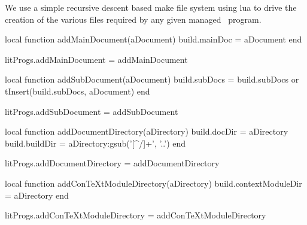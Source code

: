 
\startchapter[title=Lua Make System Files]

We use a simple recursive descent based make file system using lua to 
drive the creation of the various files required by any given 
 managed \ConTeXt\ program. 

\startMkIVCode
\def\addMainDocument#1{
  \directlua{
    thirddata.literateProgs.addMainDocument('#1')
  }
}

\def\addSubDocument#1{
  \directlua{
    thirddata.literateProgs.addSubDocument('#1')
  }
}

\def\addDocumentDirectory#1{
  \directlua{
    thirddata.literateProgs.addDocumentDirectory('#1')
  }
}

\def\addConTeXtModuleDirectory#1{
  \directlua{
    thirddata.literateProgs.addConTeXtModuleDirectory('#1')
  }
}
\stopMkIVCode

\startLuaCode
local function addMainDocument(aDocument)
  build.mainDoc = aDocument
end

litProgs.addMainDocument = addMainDocument

local function addSubDocument(aDocument)
  build.subDocs = build.subDocs or { }
  tInsert(build.subDocs, aDocument)
end

litProgs.addSubDocument = addSubDocument

local function addDocumentDirectory(aDirectory)
  build.docDir   = aDirectory
  build.buildDir = aDirectory:gsub('[^/]+', '..')
end

litProgs.addDocumentDirectory = addDocumentDirectory

local function addConTeXtModuleDirectory(aDirectory)
  build.contextModuleDir = aDirectory
end

litProgs.addConTeXtModuleDirectory = addConTeXtModuleDirectory
\stopLuaCode

\startMkIVCode
\def\compileLmsfile#1{
  \directlua{
    thirddata.literateProgs.compileLmsfile('#1')
  }
}
\stopMkIVCode

